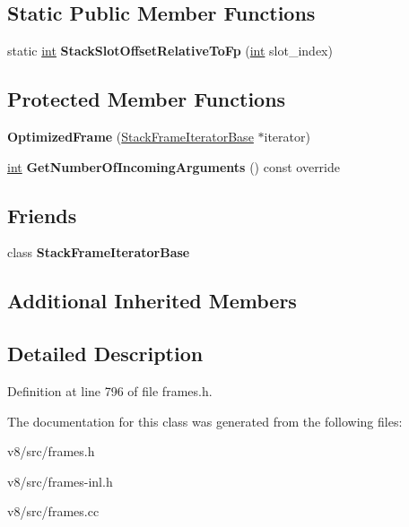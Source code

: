 \subsection*{Static Public Member Functions}
\begin{DoxyCompactItemize}
\item 
\mbox{\label{classv8_1_1internal_1_1OptimizedFrame_adff8cbaa5829ce12dc64a4544769577a}} 
static \mbox{\hyperlink{classint}{int}} {\bfseries Stack\+Slot\+Offset\+Relative\+To\+Fp} (\mbox{\hyperlink{classint}{int}} slot\+\_\+index)
\end{DoxyCompactItemize}
\subsection*{Protected Member Functions}
\begin{DoxyCompactItemize}
\item 
\mbox{\label{classv8_1_1internal_1_1OptimizedFrame_a1bbc29fa53c627003b0536cbaaadd379}} 
{\bfseries Optimized\+Frame} (\mbox{\hyperlink{classv8_1_1internal_1_1StackFrameIteratorBase}{Stack\+Frame\+Iterator\+Base}} $\ast$iterator)
\item 
\mbox{\label{classv8_1_1internal_1_1OptimizedFrame_ad51f89441abee30b846dcd9723da4f03}} 
\mbox{\hyperlink{classint}{int}} {\bfseries Get\+Number\+Of\+Incoming\+Arguments} () const override
\end{DoxyCompactItemize}
\subsection*{Friends}
\begin{DoxyCompactItemize}
\item 
\mbox{\label{classv8_1_1internal_1_1OptimizedFrame_ac7310421866976ca454bbe11c5f926c3}} 
class {\bfseries Stack\+Frame\+Iterator\+Base}
\end{DoxyCompactItemize}
\subsection*{Additional Inherited Members}


\subsection{Detailed Description}


Definition at line 796 of file frames.\+h.



The documentation for this class was generated from the following files\+:\begin{DoxyCompactItemize}
\item 
v8/src/frames.\+h\item 
v8/src/frames-\/inl.\+h\item 
v8/src/frames.\+cc\end{DoxyCompactItemize}
